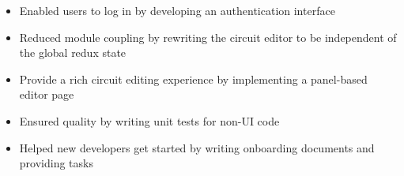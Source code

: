 
\begin{itemize}
  \item Enabled users to log in by developing an authentication interface
  \item Reduced module coupling by rewriting the circuit editor to be independent
  of the global redux state
  \item Provide a rich circuit editing experience by implementing a panel-based
  editor page
  \item Ensured quality by writing unit tests for non-UI code
  \item Helped new developers get started by writing onboarding documents and
  providing tasks
\end{itemize}
